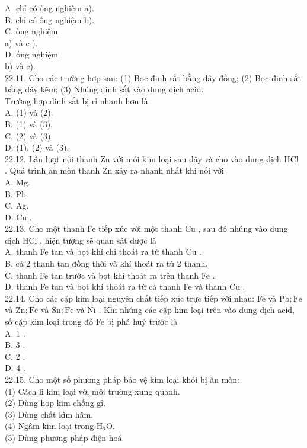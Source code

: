 \documentclass[10pt]{article}
\begin{document}
A. chỉ có ống nghiệm a).\\
B. chỉ có ống nghiệm b).\\
C. ống nghiệm\\
a) và c ).\\
D. ống nghiệm\\
b) và c).\\
22.11. Cho các trường hợp sau: (1) Bọc đinh sắt bằng dây đồng; (2) Bọc đinh sắt bằng dây kẽm; (3) Nhúng đinh sắt vào dung dịch acid.\\
Trường hợp đinh sắt bị rỉ nhanh hơn là\\
A. (1) và (2).\\
B. (1) và (3).\\
C. (2) và (3).\\
D. (1), (2) và (3).\\
22.12. Lần lượt nối thanh Zn với mỗi kim loại sau đây và cho vào dung dịch HCl . Quá trình ăn mòn thanh Zn xảy ra nhanh nhất khi nối với\\
A. Mg.\\
B. Pb.\\
C. Ag.\\
D. Cu .\\
22.13. Cho một thanh Fe tiếp xúc với một thanh Cu , sau đó nhúng vào dung dịch HCl , hiện tượng sẽ quan sát được là\\
A. thanh Fe tan và bọt khí chỉ thoát ra từ thanh Cu .\\
B. cả 2 thanh tan đồng thời và khí thoát ra từ 2 thanh.\\
C. thanh Fe tan trước và bọt khí thoát ra trên thanh Fe .\\
D. thanh Fe tan và bọt khí thoát ra từ cả thanh Fe và thanh Cu .\\
22.14. Cho các cặp kim loại nguyên chất tiếp xúc trực tiếp với nhau: Fe và $\mathrm{Pb} ; \mathrm{Fe}$ và $\mathrm{Zn} ; \mathrm{Fe}$ và $\mathrm{Sn} ; \mathrm{Fe}$ và Ni . Khi nhúng các cặp kim loại trên vào dung dịch acid, số cặp kim loại trong đó Fe bị phá huỷ trước là\\
A. 1 .\\
B. 3 .\\
C. 2 .\\
D. 4 .\\
22.15. Cho một số phương pháp bảo vệ kim loại khỏi bị ăn mòn:\\
(1) Cách li kim loại với môi trường xung quanh.\\
(2) Dùng hợp kim chống gỉ.\\
(3) Dùng chất kìm hãm.\\
(4) Ngâm kim loại trong $\mathrm{H}_{2} \mathrm{O}$.\\
(5) Dùng phương pháp điện hoá.
\end{document}
